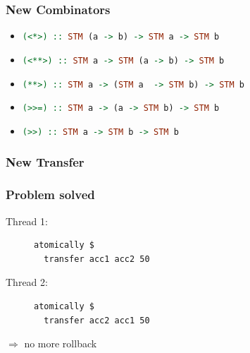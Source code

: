 \documentclass{beamer}
\begin{document}
  
  \begin{frame}
   \frametitle{New Combinators}
   \begin{itemize}\setlength\itemsep{1em}
    \item \lstinline[language=Haskell]{(<*>) :: STM (a -> b) -> STM a -> STM b}
    \item \lstinline[language=Haskell]{(<**>) :: STM a -> STM (a -> b) -> STM b}
    \item \lstinline[language=Haskell]{(**>) :: STM a -> (STM a  -> STM b) -> STM b}
    \item \lstinline[language=Haskell]{(>>=) :: STM a -> (a -> STM b) -> STM b}
    \item \lstinline[language=Haskell]{(>>) :: STM a -> STM b -> STM b}
   \end{itemize}
  \end{frame}

  
  \begin{frame}[fragile]
    \frametitle{New Transfer}
    
\end{frame}
  
 
  \begin{frame}[fragile]
    \frametitle{Problem solved}
    \fboxsep=0pt
    \noindent
    \begin{minipage}[t]{0.48\linewidth}
      Thread 1:
      \begin{figure}
       \begin{lstlisting}[frame=single]
atomically $ 
  transfer acc1 acc2 50
       \end{lstlisting}
      \end{figure}
    \end{minipage}%
    \hfill%
    \begin{minipage}[t]{0.48\linewidth}
      Thread 2:
      \begin{figure}
       \begin{lstlisting}[frame=single]
atomically $ 
  transfer acc2 acc1 50
       \end{lstlisting}
      \end{figure}
    \end{minipage}
    \vfill
    $\Rightarrow$ no more rollback
\end{frame}
  
\end{document}
